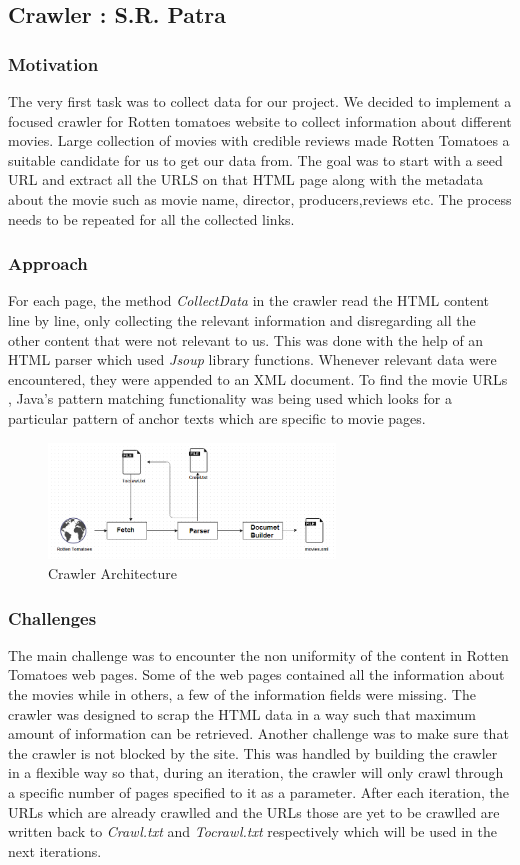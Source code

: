 \subsection{Crawler : S.R. Patra}
\subsubsection{Motivation}
The very first task was to collect data for our project. We decided to implement a focused crawler for Rotten tomatoes website to collect information about different movies. Large collection of movies with credible reviews made Rotten Tomatoes a suitable candidate for us to get our data from. The goal was to start with a seed URL and extract all the URLS on that HTML page along with the metadata about the movie such as movie name, director, producers,reviews etc. The process needs to be repeated for all the collected links.
\subsubsection{Approach}
For each page, the method \textit{CollectData} in the crawler read the HTML content line by line, only collecting the relevant information and disregarding all the other content that were not relevant to us. This was done with the help of an HTML parser which used \textit{Jsoup} library functions. Whenever relevant data were encountered, they were appended to an XML document. To find the movie URLs , Java's pattern matching functionality was being used which looks for a particular pattern of anchor texts which are specific to movie pages.

\begin{figure}[H]
    \centering
    \includegraphics[width=3.0in]{crawler_arch.png}
    \caption{Crawler Architecture}
    \label{fig:architecture}
\end{figure}

\subsubsection{Challenges}
The main challenge was to encounter the non uniformity of the content in Rotten Tomatoes web pages. Some of the web pages contained all the information about the movies while in others, a few of the information fields were missing. The crawler was designed to scrap the HTML data in a way such that maximum amount of information can be retrieved. Another challenge was to make sure that the crawler is not blocked by the site. This was handled by building the crawler in a flexible way so that, during an iteration, the crawler will only crawl through a specific number of pages specified to it as a parameter. After each iteration, the URLs which are already crawlled and the URLs those are yet to be crawlled are written back to \textit{Crawl.txt} and \textit{Tocrawl.txt} respectively which will be used in the next iterations.


